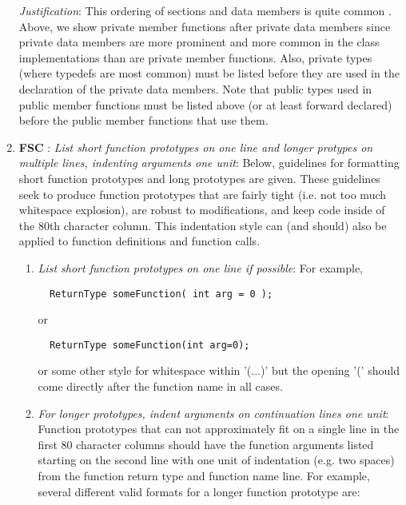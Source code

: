 \begin{enumerate}
{}\textit{Justification}: This ordering of sections and data members is quite
common {}\cite[Section 31.8]{CodeComplete2nd04}.  Above, we show private
member functions after private data members since private data members are
more prominent and more common in the class implementations than are private
member functions.  Also, private types (where typedefs are most common) must
be listed before they are used in the declaration of the private data members.
Note that public types used in public member functions must be listed above
(or at least forward declared) before the public member functions that use
them.

{}\item{}\textbf{FSC }:
{}\textit{List short function prototypes on one line and longer protypes
on multiple lines, indenting arguments one unit}: Below, guidelines for
formatting short function prototypes and long prototypes are given.  These
guidelines seek to produce function prototypes that are fairly tight (i.e. not
too much whitespace explosion), are robust to modifications, and keep code
inside of the 80th character column.  This indentation style can (and should)
also be applied to function definitions and function calls.

  \begin{enumerate}

  {}\item\textit{List short function prototypes on one line if possible}: For
  example,

  {\small\begin{verbatim}
  ReturnType someFunction( int arg = 0 );
  \end{verbatim}}

  or 

  {\small\begin{verbatim}
  ReturnType someFunction(int arg=0);
  \end{verbatim}}

  or some other style for whitespace within '(...)' but the opening '(' should
  come directly after the function name in all cases.

  {}\item\textit{For longer prototypes, indent arguments on continuation lines
  one unit}: Function prototypes that can not approximately fit on a single
  line in the first 80 character columns should have the function arguments
  listed starting on the second line with one unit of indentation (e.g. two
  spaces) from the function return type and function name line.  For example,
  several different valid formats for a longer function prototype are:


\end{enumerate}
\end{enumerate}
